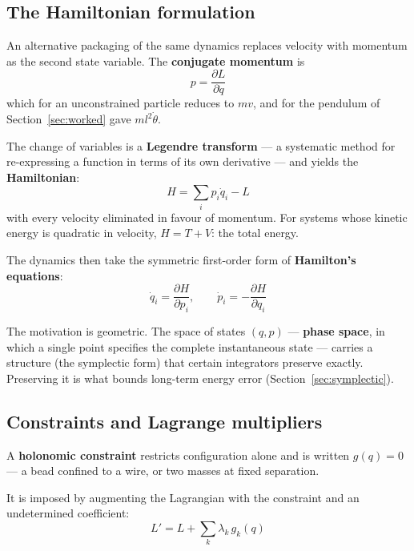 \documentclass[11pt,a4paper]{article}
\newcommand{\dd}[2]{\frac{\partial #1}{\partial #2}}
\begin{document}
\subsection{The Hamiltonian formulation}
\label{sec:hamiltonian}

An alternative packaging of the same dynamics replaces velocity with momentum as the second state
variable. The \textbf{conjugate momentum} is
\begin{equation}
p = \dd{L}{\dot q}
\end{equation}
which for an unconstrained particle reduces to $mv$, and for the pendulum of
Section~\ref{sec:worked} gave $ml^2\dot\theta$.

The change of variables is a \textbf{Legendre transform} --- a systematic method for re-expressing a
function in terms of its own derivative --- and yields the \textbf{Hamiltonian}:
\begin{equation}
H = \sum_i p_i \dot q_i - L
\end{equation}
with every velocity eliminated in favour of momentum. For systems whose kinetic energy is quadratic
in velocity, $H = T + V$: the total energy.

The dynamics then take the symmetric first-order form of \textbf{Hamilton's equations}:
\begin{equation}
\dot q_i = \dd{H}{p_i}, \qquad \dot p_i = -\dd{H}{q_i}
\end{equation}

The motivation is geometric. The space of states $(q, p)$ --- \textbf{phase space}, in which a single
point specifies the complete instantaneous state --- carries a structure (the symplectic form) that
certain integrators preserve exactly. Preserving it is what bounds long-term energy error
(Section~\ref{sec:symplectic}).

\subsection{Constraints and Lagrange multipliers}
\label{sec:constraints}

A \textbf{holonomic constraint} restricts configuration alone and is written $g(q) = 0$ --- a bead
confined to a wire, or two masses at fixed separation.

It is imposed by augmenting the Lagrangian with the constraint and an undetermined coefficient:
\begin{equation}
L' = L + \sum_k \lambda_k\, g_k(q)
\end{equation}
\end{document}
